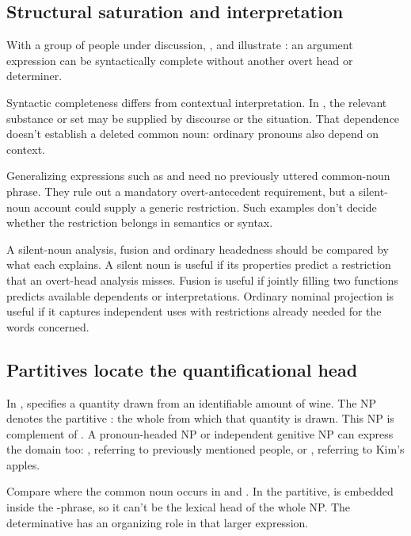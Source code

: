 \documentclass[12pt]{article}
\begin{document}
\subsection{Structural saturation and interpretation}

With a group of people under discussion, ,  and  illustrate : an argument expression can be syntactically complete without another overt head or determiner.

Syntactic completeness differs from contextual interpretation. In , the relevant substance or set may be supplied by discourse or the situation. That dependence doesn't establish a deleted common noun: ordinary pronouns also depend on context.

Generalizing expressions such as  and  need no previously uttered common-noun phrase. They rule out a mandatory overt-antecedent requirement, but a silent-noun account could supply a generic restriction. Such examples don't decide whether the restriction belongs in semantics or syntax.

A silent-noun analysis, fusion and ordinary headedness should be compared by what each explains. A silent noun is useful if its properties predict a restriction that an overt-head analysis misses. Fusion is useful if jointly filling two functions predicts available dependents or interpretations. Ordinary nominal projection is useful if it captures independent uses with restrictions already needed for the words concerned.

\subsection{Partitives locate the quantificational head}

In ,  specifies a quantity drawn from an identifiable amount of wine. The NP  denotes the partitive : the whole from which that quantity is drawn. This NP is complement of . A pronoun-headed NP or independent genitive NP can express the domain too: , referring to previously mentioned people, or , referring to Kim's apples.

Compare where the common noun occurs in  and . In the partitive,  is embedded inside the -phrase, so it can't be the lexical head of the whole NP. The determinative  has an organizing role in that larger expression.
\end{document}
